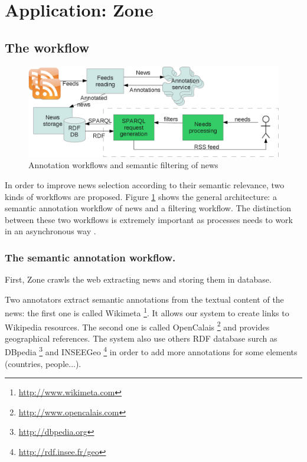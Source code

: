 \documentclass{llncs}
\begin{document}
%
\section{Application: Zone}


\subsection{The workflow}
%
\begin{figure}[htb!]
	\begin{centering}
	\includegraphics[width=1\textwidth]{diagram.png}
	\caption{Annotation workflows and semantic filtering of news}
	\label{fig:WF}
	\end{centering}
\end{figure}

In order to improve news selection according to their semantic relevance, two kinds of workflows are proposed. Figure \ref{fig:WF} shows the general architecture: a semantic annotation workflow of news and a filtering workflow. The distinction between these two workflows is extremely important as processes needs to work in an asynchronous way \cite{desclaux:urli}.

\subsubsection{The semantic annotation workflow.}
First, Zone crawls the web extracting news and storing them in database.

Two annotators extract semantic annotations from the textual content of the news: the first one is called Wikimeta \footnote{\url{http://www.wikimeta.com}}. It allows our system to create links to Wikipedia resources. The second one is called OpenCalais \footnote{\url{http://www.opencalais.com}} and provides geographical references.
The system also use others RDF database surch as DBpedia \footnote{\url{http://dbpedia.org}} and INSEEGeo \footnote{\url{http://rdf.insee.fr/geo}} in order to add more annotations for some elements (countries, people...).
\end{document}
